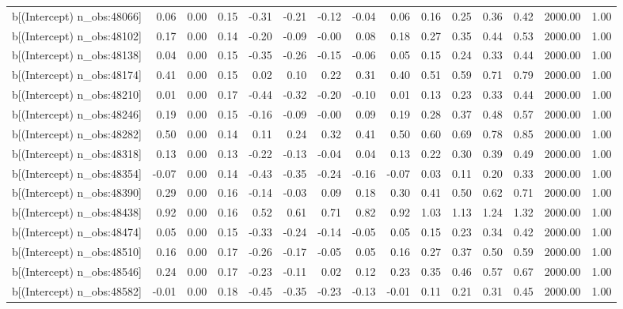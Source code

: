 \begin{table}[ht]
\begin{tabular}{rrrrrrrrrrrrrrr}
  b[(Intercept) n\_obs:48066] & 0.06 & 0.00 & 0.15 & -0.31 & -0.21 & -0.12 & -0.04 & 0.06 & 0.16 & 0.25 & 0.36 & 0.42 & 2000.00 & 1.00 \\ 
  b[(Intercept) n\_obs:48102] & 0.17 & 0.00 & 0.14 & -0.20 & -0.09 & -0.00 & 0.08 & 0.18 & 0.27 & 0.35 & 0.44 & 0.53 & 2000.00 & 1.00 \\ 
  b[(Intercept) n\_obs:48138] & 0.04 & 0.00 & 0.15 & -0.35 & -0.26 & -0.15 & -0.06 & 0.05 & 0.15 & 0.24 & 0.33 & 0.44 & 2000.00 & 1.00 \\ 
  b[(Intercept) n\_obs:48174] & 0.41 & 0.00 & 0.15 & 0.02 & 0.10 & 0.22 & 0.31 & 0.40 & 0.51 & 0.59 & 0.71 & 0.79 & 2000.00 & 1.00 \\ 
  b[(Intercept) n\_obs:48210] & 0.01 & 0.00 & 0.17 & -0.44 & -0.32 & -0.20 & -0.10 & 0.01 & 0.13 & 0.23 & 0.33 & 0.44 & 2000.00 & 1.00 \\ 
  b[(Intercept) n\_obs:48246] & 0.19 & 0.00 & 0.15 & -0.16 & -0.09 & -0.00 & 0.09 & 0.19 & 0.28 & 0.37 & 0.48 & 0.57 & 2000.00 & 1.00 \\ 
  b[(Intercept) n\_obs:48282] & 0.50 & 0.00 & 0.14 & 0.11 & 0.24 & 0.32 & 0.41 & 0.50 & 0.60 & 0.69 & 0.78 & 0.85 & 2000.00 & 1.00 \\ 
  b[(Intercept) n\_obs:48318] & 0.13 & 0.00 & 0.13 & -0.22 & -0.13 & -0.04 & 0.04 & 0.13 & 0.22 & 0.30 & 0.39 & 0.49 & 2000.00 & 1.00 \\ 
  b[(Intercept) n\_obs:48354] & -0.07 & 0.00 & 0.14 & -0.43 & -0.35 & -0.24 & -0.16 & -0.07 & 0.03 & 0.11 & 0.20 & 0.33 & 2000.00 & 1.00 \\ 
  b[(Intercept) n\_obs:48390] & 0.29 & 0.00 & 0.16 & -0.14 & -0.03 & 0.09 & 0.18 & 0.30 & 0.41 & 0.50 & 0.62 & 0.71 & 2000.00 & 1.00 \\ 
  b[(Intercept) n\_obs:48438] & 0.92 & 0.00 & 0.16 & 0.52 & 0.61 & 0.71 & 0.82 & 0.92 & 1.03 & 1.13 & 1.24 & 1.32 & 2000.00 & 1.00 \\ 
  b[(Intercept) n\_obs:48474] & 0.05 & 0.00 & 0.15 & -0.33 & -0.24 & -0.14 & -0.05 & 0.05 & 0.15 & 0.23 & 0.34 & 0.42 & 2000.00 & 1.00 \\ 
  b[(Intercept) n\_obs:48510] & 0.16 & 0.00 & 0.17 & -0.26 & -0.17 & -0.05 & 0.05 & 0.16 & 0.27 & 0.37 & 0.50 & 0.59 & 2000.00 & 1.00 \\ 
  b[(Intercept) n\_obs:48546] & 0.24 & 0.00 & 0.17 & -0.23 & -0.11 & 0.02 & 0.12 & 0.23 & 0.35 & 0.46 & 0.57 & 0.67 & 2000.00 & 1.00 \\ 
  b[(Intercept) n\_obs:48582] & -0.01 & 0.00 & 0.18 & -0.45 & -0.35 & -0.23 & -0.13 & -0.01 & 0.11 & 0.21 & 0.31 & 0.45 & 2000.00 & 1.00 \\ 

\end{tabular}
\end{table}
